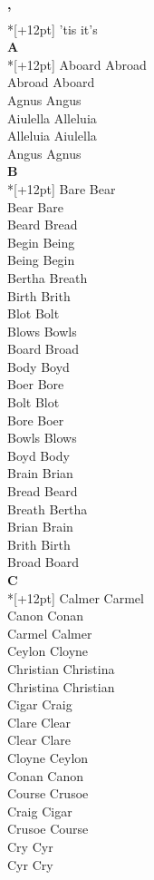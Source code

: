 
\vspace{14pt}
\noindent\textbf{\Large '}\\*[+12pt]
'tis it's\\

\vspace{14pt}
\noindent\textbf{\Large A}\\*[+12pt]
Aboard Abroad\\
Abroad Aboard\\
Agnus Angus\\
Aiulella Alleluia\\
Alleluia Aiulella\\
Angus Agnus\\

\vspace{14pt}
\noindent\textbf{\Large B}\\*[+12pt]
Bare Bear\\
Bear Bare\\
Beard Bread\\
Begin Being\\
Being Begin\\
Bertha Breath\\
Birth Brith\\
Blot Bolt\\
Blows Bowls\\
Board Broad\\
Body Boyd\\
Boer Bore\\
Bolt Blot\\
Bore Boer\\
Bowls Blows\\
Boyd Body\\
Brain Brian\\
Bread Beard\\
Breath Bertha\\
Brian Brain\\
Brith Birth\\
Broad Board\\

\vspace{14pt}
\noindent\textbf{\Large C}\\*[+12pt]
Calmer Carmel\\
Canon Conan\\
Carmel Calmer\\
Ceylon Cloyne\\
Christian Christina\\
Christina Christian\\
Cigar Craig\\
Clare Clear\\
Clear Clare\\
Cloyne Ceylon\\
Conan Canon\\
Course Crusoe\\
Craig Cigar\\
Crusoe Course\\
Cry Cyr\\
Cyr Cry\\

